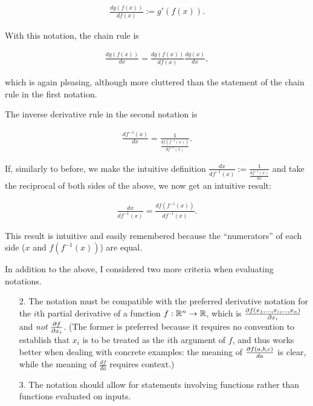 \begin{align*}
    \frac{dg(f(x))}{df(x)} := g'(f(x)).
\end{align*}

With this notation, the chain rule is

\begin{align*}
    \frac{dg(f(x))}{dx} = \frac{dg(f(x))}{df(x)} \frac{dg(x)}{dx},
\end{align*}

which is again pleasing, although more cluttered than the statement of the chain rule in the first notation.

The inverse derivative rule in the second notation is

\begin{align*}
    \frac{df^{-1}(x)}{dx} = \frac{1}{\frac{df(f^{-1}(x))}{df^{-1}(x)}}.
\end{align*}

If, similarly to before, we make the intuitive definition $\frac{dx}{df^{-1}(x)} := \frac{1}{\frac{df^{-1}(x)}{dx}}$ and take the reciprocal of both sides of the above, we now get an intuitive result:

\begin{align*}
    \frac{dx}{df^{-1}(x)} = \frac{df(f^{-1}(x))}{df^{-1}(x)}.
\end{align*}

This result is intuitive and easily remembered because the ``numerators'' of each side ($x$ and $f(f^{-1}(x))$) are equal.

In addition to the above, I considered two more criteria when evaluating notations.

\begin{enumerate}
    \item[2.] The notation must be compatible with the preferred derivative notation for the $i$th partial derivative of a function $f:\mathbb{R}^n \rightarrow \mathbb{R}$, which is $\frac{\partial f(x_1, ..., x_i, ..., x_n)}{\partial x_i}$ and \textit{not} $\frac{\partial f}{\partial x_i}$. (The former is preferred because it requires no convention to establish that $x_i$ is to be treated as the $i$th argument of $f$, and thus works better when dealing with concrete examples: the meaning of $\frac{\partial f(a, b, c)}{da}$ is clear, while the meaning of $\frac{df}{da}$ requires context.)
    \item[3.] The notation should allow for statements involving functions rather than functions evaluated on inputs.
\end{enumerate}

